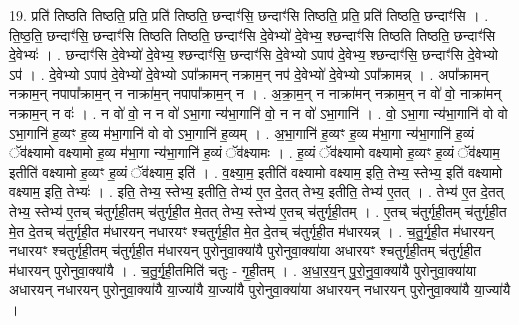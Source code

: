 \documentclass[17pt]{extarticle}
\begin{document}
19. प्रति॑ तिष्ठति तिष्ठति॒ प्रति॒ प्रति॑ तिष्ठति॒ छन्दाꣳ॑सि॒ छन्दाꣳ॑सि तिष्ठति॒ प्रति॒ प्रति॑ तिष्ठति॒ छन्दाꣳ॑सि । . ति॒ष्ठ॒ति॒ छन्दाꣳ॑सि॒ छन्दाꣳ॑सि तिष्ठति तिष्ठति॒ छन्दाꣳ॑सि दे॒वेभ्यो॑ दे॒वेभ्य॒ श्छन्दाꣳ॑सि तिष्ठति तिष्ठति॒ छन्दाꣳ॑सि दे॒वेभ्यः॑ । . छन्दाꣳ॑सि दे॒वेभ्यो॑ दे॒वेभ्य॒ श्छन्दाꣳ॑सि॒ छन्दाꣳ॑सि दे॒वेभ्यो ऽपाप॑ दे॒वेभ्य॒ श्छन्दाꣳ॑सि॒ छन्दाꣳ॑सि दे॒वेभ्यो ऽप॑ । . दे॒वेभ्यो ऽपाप॑ दे॒वेभ्यो॑ दे॒वेभ्यो ऽपा᳚क्रामन् नक्राम॒न् नप॑ दे॒वेभ्यो॑ दे॒वेभ्यो ऽपा᳚क्रामन्न् । . अपा᳚क्रामन् नक्राम॒न् नपापा᳚क्राम॒न् न नाक्रा॑म॒न् नपापा᳚क्राम॒न् न । . अ॒क्रा॒म॒न् न नाक्रा॑मन् नक्राम॒न् न वो॑ वो॒ नाक्रा॑मन् नक्राम॒न् न वः॑ । . न वो॑ वो॒ न न वो॑ ऽभा॒गा न्य॑भा॒गानि॑ वो॒ न न वो॑ ऽभा॒गानि॑ । . वो॒ ऽभा॒गा न्य॑भा॒गानि॑ वो वो ऽभा॒गानि॑ ह॒व्यꣳ ह॒व्य म॑भा॒गानि॑ वो वो ऽभा॒गानि॑ ह॒व्यम् । . अ॒भा॒गानि॑ ह॒व्यꣳ ह॒व्य म॑भा॒गा न्य॑भा॒गानि॑ ह॒व्यं ॅव॑क्ष्यामो वक्ष्यामो ह॒व्य म॑भा॒गा न्य॑भा॒गानि॑ ह॒व्यं ॅव॑क्ष्यामः । . ह॒व्यं ॅव॑क्ष्यामो वक्ष्यामो ह॒व्यꣳ ह॒व्यं ॅव॑क्ष्याम॒ इतीति॑ वक्ष्यामो ह॒व्यꣳ ह॒व्यं ॅव॑क्ष्याम॒ इति॑ । . व॒क्ष्या॒म॒ इतीति॑ वक्ष्यामो वक्ष्याम॒ इति॒ तेभ्य॒ स्तेभ्य॒ इति॑ वक्ष्यामो वक्ष्याम॒ इति॒ तेभ्यः॑ । . इति॒ तेभ्य॒ स्तेभ्य॒ इतीति॒ तेभ्य॑ ए॒त दे॒तत् तेभ्य॒ इतीति॒ तेभ्य॑ ए॒तत् । . तेभ्य॑ ए॒त दे॒तत् तेभ्य॒ स्तेभ्य॑ ए॒तच् च॑तुर्गृही॒तम् च॑तुर्गृही॒त मे॒तत् तेभ्य॒ स्तेभ्य॑ ए॒तच् च॑तुर्गृही॒तम् । . ए॒तच् च॑तुर्गृही॒तम् च॑तुर्गृही॒त मे॒त दे॒तच् च॑तुर्गृही॒त म॑धारयन् नधारयꣳ श्चतुर्गृही॒त मे॒त दे॒तच् च॑तुर्गृही॒त म॑धारयन्न् । . च॒तु॒र्गृ॒ही॒त म॑धारयन् नधारयꣳ श्चतुर्गृही॒तम् च॑तुर्गृही॒त म॑धारयन् पुरोनुवा॒क्या॑यै पुरोनुवा॒क्या॑या अधारयꣳ श्चतुर्गृही॒तम् च॑तुर्गृही॒त म॑धारयन् पुरोनुवा॒क्या॑यै । . च॒तु॒र्गृ॒ही॒तमिति॑ चतुः - गृ॒ही॒तम् । . अ॒धा॒र॒य॒न् पु॒रो॒नु॒वा॒क्या॑यै पुरोनुवा॒क्या॑या अधारयन् नधारयन् पुरोनुवा॒क्या॑यै या॒ज्या॑यै या॒ज्या॑यै पुरोनुवा॒क्या॑या अधारयन् नधारयन् पुरोनुवा॒क्या॑यै या॒ज्या॑यै । \newline
\end{document}
